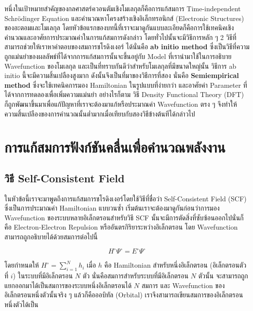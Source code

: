 หนึ่งในเป้าหมายสำคัญของกลศาสตร์ควอนตัมเชิงโมเลกุลก็คือการแก้สมการ Time-independent Schrödinger Equation และคำนวณหาโครงสร้างเชิงอิเล็กทรอนิกส์ 
(Electronic Structures) ของอะตอมและโมเลกุล โดยหัวข้อแรกของบทนี้ที่เราจะมาดูกันแบบละเอียดก็คือการใช้เทคนิคเชิงคำนวณและอาศัยการประมาณค่าในการแก้สมการดังกล่าว
โดยทั่วไปนั้นจะมีวิธีการหลัก ๆ 2 วิธีที่สามารถช่วยให้เราหาคำตอบของสมการชโรดิงเงอร์ ได้นั่นคือ \textbf{ab initio method} 
ซึ่งเป็นวิธีที่ความถูกแม่นยำของผลลัพธ์ที่ได้จากการแก้สมการนั้นจะขึ้นอยู่กับ Model ที่เรานำมาใช้ในการอธิบาย Wavefunction ของโมเลกุล 
และเป็นที่ทราบกันดีว่าสำหรับโมเลกุลที่มีขนาดใหญ่นั้น วิธีการ ab initio นี้จะมีความสิ้นเปลืองสูงมาก ดังนั้นจึงเป็นที่มาของวิธีการที่สอง นั่นคือ 
\textbf{Semiempirical method} ซึ่งจะใช้เทคนิคการมอง Hamiltonian ในรูปแบบที่ง่ายกว่า และอาศัยค่า Parameter ที่ได้จากการทดลองเพื่อเพิ่มความแม่นยำ 
อย่างไรก็ตาม วิธี Density Functional Theory (DFT) ก็ถูกพัฒนาขึ้นมาเพื่อแก้ปัญหาที่เราจะต้องมาแก้หรือประมาณค่า Wavefunction ตรง ๆ 
จึงทำให้ความสิ้นเปลืองของการคำนวณนั้นต่ำมากเมื่อเทียบกับสองวิธีข้างต้นทีได้กล่าวไป

\section{การแก้สมการฟังก์ชันคลื่นเพื่อคำนวณพลังงาน}

\subsection{วิธี Self-Consistent Field}

ในหัวข้อนี้เราจะมาพูดถึงการแก้สมการชโรดิงเงอร์โดยใช้วิธีที่ชื่อว่า Self-Consistent Field (SCF) ซึ่งเป็นการประมาณค่า Hamiltonian แบบวนซ้ำ
เริ่มต้นเราจะต้องมาดูกันก่อนว่าการมอง Wavefunction ของระบบหลายอิเล็กตรอนสำหรับวิธี SCF นั้นจะมีการตัดสิ่งที่ซับซ้อนออกไปนั่นก็คือ
Electron-Electron Repulsion หรืออันตรกิริยาระหว่างอิเล็กตรอน โดย Wavefunction สามารถถูกอธิบายได้ด้วยสมการต่อไปนี้

\begin{equation}
    H^{\circ} \Psi^{\circ} = E^{\circ} \Psi^{\circ}
\end{equation}

โดยกำหนดให้ $H^{\circ} = \sum^{N}_{i=1} h_{i}$ เมื่อ $h$ คือ Hamiltonian สำหรับหนึ่งอิเล็กตรอน (อิเล็กตรอนตัวที่ $i$) ในระบบที่มีอิเล็กตรอน $N$ ตัว 
นั่นคือสมการสำหรับระบบที่มีอิเล็กตรอน $N$ ตัวนั้น จะสามารถถูกแยกออกมาได้เป็นสมการของระบบหนึ่งอิเล็กตรอนได้ $N$ สมการ 
และ Wavefunction ของอิเล็กตรอนหนึ่งตัวนั้นจริง ๆ แล้วก็คือออบิทัล (Orbital) เราจึงสามารถเขียนสมการของอิเล็กตรอนหนึ่งตัวได้เป็น

